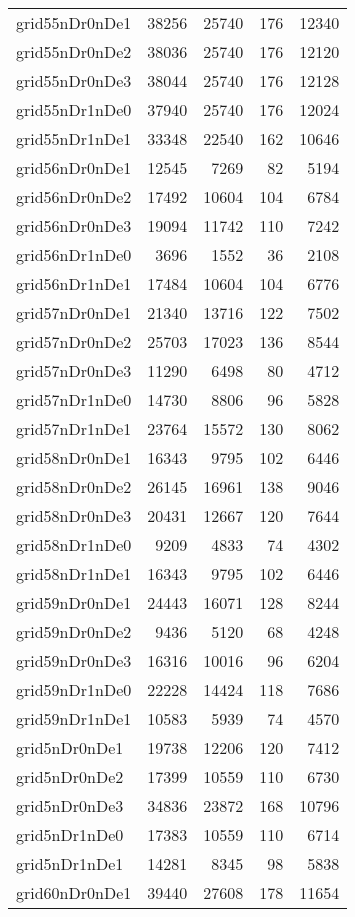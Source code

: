 \begin{longtable}{lrrrr}
grid55nDr0nDe1 & 38256 & 25740 & 176 & 12340 \\
grid55nDr0nDe2 & 38036 & 25740 & 176 & 12120 \\
grid55nDr0nDe3 & 38044 & 25740 & 176 & 12128 \\
grid55nDr1nDe0 & 37940 & 25740 & 176 & 12024 \\
grid55nDr1nDe1 & 33348 & 22540 & 162 & 10646 \\
grid56nDr0nDe1 & 12545 & 7269 & 82 & 5194 \\
grid56nDr0nDe2 & 17492 & 10604 & 104 & 6784 \\
grid56nDr0nDe3 & 19094 & 11742 & 110 & 7242 \\
grid56nDr1nDe0 & 3696 & 1552 & 36 & 2108 \\
grid56nDr1nDe1 & 17484 & 10604 & 104 & 6776 \\
grid57nDr0nDe1 & 21340 & 13716 & 122 & 7502 \\
grid57nDr0nDe2 & 25703 & 17023 & 136 & 8544 \\
grid57nDr0nDe3 & 11290 & 6498 & 80 & 4712 \\
grid57nDr1nDe0 & 14730 & 8806 & 96 & 5828 \\
grid57nDr1nDe1 & 23764 & 15572 & 130 & 8062 \\
grid58nDr0nDe1 & 16343 & 9795 & 102 & 6446 \\
grid58nDr0nDe2 & 26145 & 16961 & 138 & 9046 \\
grid58nDr0nDe3 & 20431 & 12667 & 120 & 7644 \\
grid58nDr1nDe0 & 9209 & 4833 & 74 & 4302 \\
grid58nDr1nDe1 & 16343 & 9795 & 102 & 6446 \\
grid59nDr0nDe1 & 24443 & 16071 & 128 & 8244 \\
grid59nDr0nDe2 & 9436 & 5120 & 68 & 4248 \\
grid59nDr0nDe3 & 16316 & 10016 & 96 & 6204 \\
grid59nDr1nDe0 & 22228 & 14424 & 118 & 7686 \\
grid59nDr1nDe1 & 10583 & 5939 & 74 & 4570 \\
grid5nDr0nDe1 & 19738 & 12206 & 120 & 7412 \\
grid5nDr0nDe2 & 17399 & 10559 & 110 & 6730 \\
grid5nDr0nDe3 & 34836 & 23872 & 168 & 10796 \\
grid5nDr1nDe0 & 17383 & 10559 & 110 & 6714 \\
grid5nDr1nDe1 & 14281 & 8345 & 98 & 5838 \\
grid60nDr0nDe1 & 39440 & 27608 & 178 & 11654 \\

\end{longtable}
